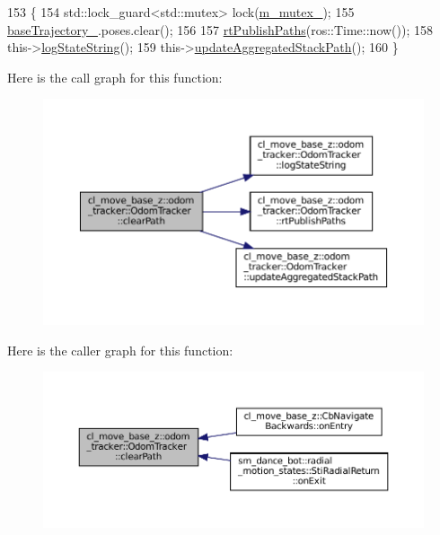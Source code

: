 \begin{DoxyCode}
153 \{
154     std::lock\_guard<std::mutex> lock(\hyperlink{classcl__move__base__z_1_1odom__tracker_1_1OdomTracker_aa371639e1eee269273dec8d3ab9dba0f}{m\_mutex\_});
155     \hyperlink{classcl__move__base__z_1_1odom__tracker_1_1OdomTracker_a466d18a86df049f0f680e043bb5ea91f}{baseTrajectory\_}.poses.clear();
156 
157     \hyperlink{classcl__move__base__z_1_1odom__tracker_1_1OdomTracker_a8f728f85d1f3f49f4b94e37052a59d6d}{rtPublishPaths}(ros::Time::now());
158     this->\hyperlink{classcl__move__base__z_1_1odom__tracker_1_1OdomTracker_a6d0b450474d9d555205ff4281965164e}{logStateString}();
159     this->\hyperlink{classcl__move__base__z_1_1odom__tracker_1_1OdomTracker_a7922f1e1e688a2ed62d32d9914985a9f}{updateAggregatedStackPath}();
160 \}
\end{DoxyCode}
Here is the call graph for this function\+:
\nopagebreak
\begin{figure}[H]
\begin{center}
\leavevmode
\includegraphics[width=350pt]{classcl__move__base__z_1_1odom__tracker_1_1OdomTracker_a93a14e15e3e623f530e056f403bf7644_cgraph}
\end{center}
\end{figure}
Here is the caller graph for this function\+:
\nopagebreak
\begin{figure}[H]
\begin{center}
\leavevmode
\includegraphics[width=350pt]{classcl__move__base__z_1_1odom__tracker_1_1OdomTracker_a93a14e15e3e623f530e056f403bf7644_icgraph}
\end{center}
\end{figure}

